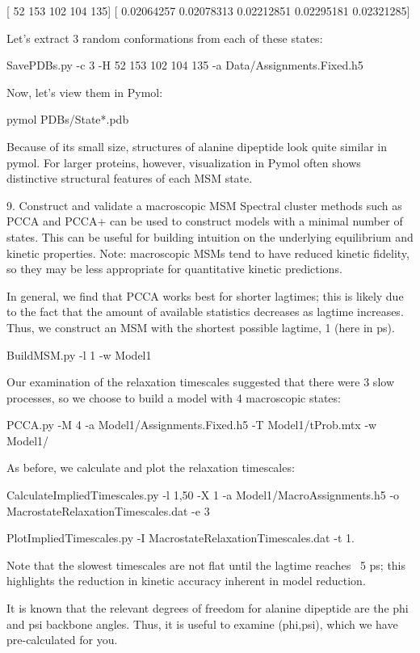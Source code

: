 \documentclass[12pt]{article}
\begin{document}
[ 52 153 102 104 135]
[ 0.02064257  0.02078313  0.02212851  0.02295181  0.02321285]

Let’s extract 3 random conformations from each of these states:

SavePDBs.py -c 3 -H  52 153 102 104 135 -a Data/Assignments.Fixed.h5

Now, let’s view them in Pymol:

pymol PDBs/State*.pdb

Because of its small size, structures of alanine dipeptide look quite similar in pymol.  For larger proteins, however, visualization in Pymol often shows distinctive structural features of each MSM state.  

9.  Construct and validate a macroscopic MSM
Spectral cluster methods such as PCCA and PCCA+ can be used to construct models with a minimal number of states.  This can be useful for building intuition on the underlying equilibrium and kinetic properties.  
Note: macroscopic MSMs tend to have reduced kinetic fidelity, so they may be less appropriate for quantitative kinetic predictions.  

In general, we find that PCCA works best for shorter lagtimes; this is likely due to the fact that the amount of available statistics decreases as lagtime increases.  Thus, we construct an MSM with the shortest possible lagtime, 1 (here in ps).

BuildMSM.py -l 1 -w Model1

Our examination of the relaxation timescales suggested that there were 3 slow processes, so we choose to build a model with 4 macroscopic states:

PCCA.py -M 4 -a Model1/Assignments.Fixed.h5 -T Model1/tProb.mtx -w Model1/

As before, we calculate and plot the relaxation timescales:

CalculateImpliedTimescales.py -l 1,50 -X 1 -a Model1/MacroAssignments.h5 -o MacrostateRelaxationTimescales.dat -e 3

PlotImpliedTimescales.py -I MacrostateRelaxationTimescales.dat  -t 1.

Note that the slowest timescales are not flat until the lagtime reaches ~5 ps; this highlights the reduction in kinetic accuracy inherent in model reduction.  

It is known that the relevant degrees of freedom for alanine dipeptide are the phi and psi backbone angles.  Thus, it is useful to examine (phi,psi), which we have pre-calculated for you.
\end{document}
